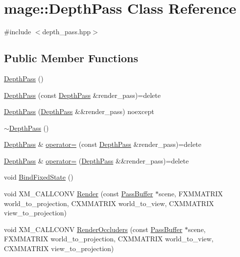 \hypertarget{classmage_1_1_depth_pass}{}\section{mage\+:\+:Depth\+Pass Class Reference}
\label{classmage_1_1_depth_pass}


{\ttfamily \#include $<$depth\+\_\+pass.\+hpp$>$}

\subsection*{Public Member Functions}
\begin{DoxyCompactItemize}
\item 
\hyperlink{classmage_1_1_depth_pass_a16a23f6820a11faf9195b307474e355b}{Depth\+Pass} ()
\item 
\hyperlink{classmage_1_1_depth_pass_a9f0376b1423404dcced29535d59dd18c}{Depth\+Pass} (const \hyperlink{classmage_1_1_depth_pass}{Depth\+Pass} \&render\+\_\+pass)=delete
\item 
\hyperlink{classmage_1_1_depth_pass_a7f6f3a471223f224492b286d74a59325}{Depth\+Pass} (\hyperlink{classmage_1_1_depth_pass}{Depth\+Pass} \&\&render\+\_\+pass) noexcept
\item 
\hyperlink{classmage_1_1_depth_pass_adc89d5da94b42294316d4ad1dfa09eb4}{$\sim$\+Depth\+Pass} ()
\item 
\hyperlink{classmage_1_1_depth_pass}{Depth\+Pass} \& \hyperlink{classmage_1_1_depth_pass_ac84074238d8ce69251fc2e6f294c5898}{operator=} (const \hyperlink{classmage_1_1_depth_pass}{Depth\+Pass} \&render\+\_\+pass)=delete
\item 
\hyperlink{classmage_1_1_depth_pass}{Depth\+Pass} \& \hyperlink{classmage_1_1_depth_pass_ab6a7d2abf0876f84591328d448ac1203}{operator=} (\hyperlink{classmage_1_1_depth_pass}{Depth\+Pass} \&\&render\+\_\+pass)=delete
\item 
void \hyperlink{classmage_1_1_depth_pass_ae456ab7e6818e86ab2c09338652c9be0}{Bind\+Fixed\+State} ()
\item 
void X\+M\+\_\+\+C\+A\+L\+L\+C\+O\+NV \hyperlink{classmage_1_1_depth_pass_a266e186a56e4a81b9a0e535dca143947}{Render} (const \hyperlink{structmage_1_1_pass_buffer}{Pass\+Buffer} $\ast$scene, F\+X\+M\+M\+A\+T\+R\+IX world\+\_\+to\+\_\+projection, C\+X\+M\+M\+A\+T\+R\+IX world\+\_\+to\+\_\+view, C\+X\+M\+M\+A\+T\+R\+IX view\+\_\+to\+\_\+projection)
\item 
void X\+M\+\_\+\+C\+A\+L\+L\+C\+O\+NV \hyperlink{classmage_1_1_depth_pass_a51609c054c2d036777a032018bd0cc70}{Render\+Occluders} (const \hyperlink{structmage_1_1_pass_buffer}{Pass\+Buffer} $\ast$scene, F\+X\+M\+M\+A\+T\+R\+IX world\+\_\+to\+\_\+projection, C\+X\+M\+M\+A\+T\+R\+IX world\+\_\+to\+\_\+view, C\+X\+M\+M\+A\+T\+R\+IX view\+\_\+to\+\_\+projection)
\end{DoxyCompactItemize}
